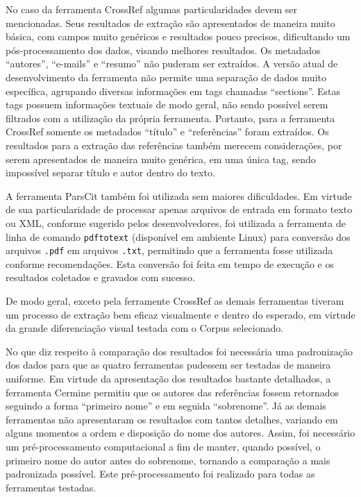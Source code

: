 No caso da ferramenta CrossRef algumas particularidades devem ser mencionadas. Seus resultados de extração são apresentados de maneira muito básica, com campos muito genéricos e resultados pouco precisos, dificultando um pós-processamento dos dados, visando melhores resultados. Os metadados ``autores'', ``e-mails'' e ``resumo'' não puderam ser extraídos. A versão atual de desenvolvimento da ferramenta não permite uma separação de dados muito específica, agrupando diversas informações em tags chamadas ``sections''. Estas tags possuem informações textuais de modo geral, não sendo possível serem filtrados com a utilização da própria ferramenta. Portanto, para a ferramenta CrossRef somente os metadados ``título'' e ``referências'' foram extraídos. Os resultados para a extração das referências também merecem considerações, por serem apresentados de maneira muito genérica, em uma única tag, sendo impossível separar título e autor dentro do texto.

A ferramenta ParsCit também foi utilizada sem maiores dificuldades. Em virtude de sua particularidade de processar apenas arquivos de entrada em formato texto ou XML, conforme sugerido pelos desenvolvedores, foi utilizada a ferramenta de linha de comando \texttt{pdftotext} (disponível em ambiente Linux) para conversão dos arquivos \texttt{.pdf} em arquivos \texttt{.txt}, permitindo que a ferramenta fosse utilizada conforme recomendações. Esta conversão foi feita em tempo de execução e os resultados coletados e gravados com sucesso.

De modo geral, exceto pela ferramente CrossRef as demais ferramentas tiveram um processo de extração bem eficaz visualmente e dentro do esperado, em virtude da grande diferenciação visual testada com o Corpus selecionado. 


No que diz respeito à comparação dos resultados foi necessária uma padronização dos dados para que as quatro ferramentas pudessem ser testadas de maneira uniforme. Em virtude da apresentação dos resultados bastante detalhados, a ferramenta Cermine permitiu que os autores das referências fossem retornados seguindo a forma ``primeiro nome'' e em seguida ``sobrenome''. Já as demais ferramentas não apresentaram os resultados com tantos detalhes, variando em alguns momentos a ordem e disposição do nome dos autores. Assim, foi necessário um pré-processamento computacional a fim de manter, quando possível, o primeiro nome do autor antes do sobrenome, tornando a comparação a mais padronizada possível. Este pré-processamento foi realizado para todas as ferramentas testadas.

